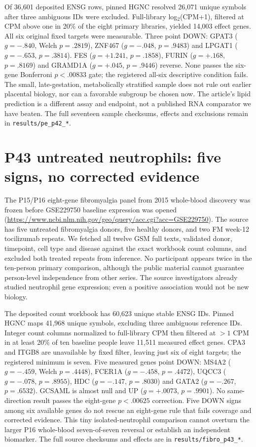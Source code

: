 \documentclass[11pt,a4paper]{article}
\begin{document}
Of 36,601 deposited ENSG rows, pinned HGNC resolved 26,071 unique symbols after three ambiguous IDs were excluded. Full-library log$_2$(CPM+1), filtered at CPM above one in 20\% of the eight primary libraries, yielded 14,003 effect genes. All six original fixed targets were measurable. Three point DOWN: GPAT3 ($g=-.840$, Welch $p=.2819$), ZNF467 ($g=-.048$, $p=.9483$) and LPGAT1 ($g=-.653$, $p=.3814$). FES ($g=+1.241$, $p=.1858$), FURIN ($g=+.168$, $p=.8169$) and GRAMD1A ($g=+.045$, $p=.9446$) reverse. None passes the six-gene Bonferroni $p<.00833$ gate; the registered all-six descriptive condition fails. The small, late-gestation, metabolically stratified sample does not rule out earlier placental biology, nor can a favorable subgroup be chosen now. The article's lipid prediction is a different assay and endpoint, not a published RNA comparator we have beaten. The full seventeen sample checksums, effects and exclusions remain in \texttt{results/pe\_p42\_*}.

\section{P43 untreated neutrophils: five signs, no corrected evidence}
The P15/P16 eight-gene fibromyalgia panel from 2015 whole-blood discovery was frozen before GSE229750 baseline expression was opened (\url{https://www.ncbi.nlm.nih.gov/geo/query/acc.cgi?acc=GSE229750}). The source has five untreated fibromyalgia donors, five healthy donors, and two FM week-12 tocilizumab repeats. We fetched all twelve GSM full texts, validated donor, timepoint, cell type and disease against the exact workbook count columns, and excluded both treated repeats from inference. No participant appears twice in the ten-person primary comparison, although the public material cannot guarantee person-level independence from other series. The source investigators already studied neutrophil gene expression; even a positive association would not be new biology.

The deposited count workbook has 60,623 unique stable ENSG IDs. Pinned HGNC maps 41,968 unique symbols, excluding three ambiguous reference IDs. Integer count columns normalized to full-library CPM then filtered at $>1$ CPM in at least 20\% of ten baseline people leave 11,511 measured effect genes. CPA3 and ITGB8 are unavailable by fixed filter, leaving just six of eight targets; the registered minimum is seven. Five measured genes point DOWN: MS4A2 ($g=-.459$, Welch $p=.4448$), FCER1A ($g=-.458$, $p=.4472$), UQCC3 ($g=-.078$, $p=.8955$), HDC ($g=-.147$, $p=.8030$) and GATA2 ($g=-.267$, $p=.6532$). GCSAML is almost null and UP ($g=+.0073$, $p=.9901$). No same-direction result passes the eight-gene $p<.00625$ correction. Five DOWN signs among six available genes do not rescue an eight-gene rule that fails coverage and corrected evidence. This tiny isolated-neutrophil comparison cannot overturn the larger P16 whole-blood seven-of-seven reversal or establish an independent biomarker. The full source checksums and effects are in \texttt{results/fibro\_p43\_*}.
\end{document}
